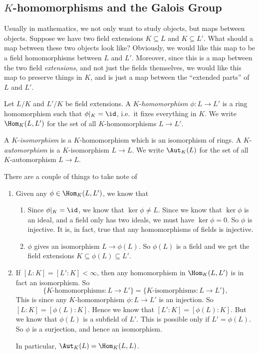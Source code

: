 \documentclass[a4paper]{article}
\begin{document}
\subsection{\texorpdfstring{$K$}{K}-homomorphisms and the Galois Group}
Usually in mathematics, we not only want to study objects, but maps between objects. Suppose we have two field extensions $K \subseteq L$ and $K \subseteq L'$. What should a map between these two objects look like? Obviously, we would like this map to be a field homomorphisms between $L$ and $L'$. Moreover, since this is a map between the two field \emph{extensions}, and not just the fields themselves, we would like this map to preserve things in $K$, and is just a map between the ``extended parts'' of $L$ and $L'$.

\begin{defi}[$K$-homomorphism]
  Let $L/K$ and $L'/K$ be field extensions. A $K$-\emph{homomorphism} $\phi: L \to L'$ is a ring homomorphism such that $\phi|_K = \id$, i.e.\ it fixes everything in $K$. We write $\Hom_K(L, L')$ for the set of all $K$-homomorphisms $L\to L'$.

  A $K$-\emph{isomorphism} is a $K$-homomorphism which is an isomorphism of rings. A $K$-\emph{automorphism} is a $K$-isomorphism $L\to L$. We write $\Aut_K(L)$ for the set of all $K$-automorphism $L\to L$.
\end{defi}
There are a couple of things to take note of
\begin{enumerate}
  \item Given any $\phi \in \Hom_K(L, L')$, we know that
    \begin{enumerate}
      \item Since $\phi|_K = \id$, we know that $\ker \phi \not= L$. Since we know that $\ker \phi$ is an ideal, and a field only has two ideals, we must have $\ker \phi = 0$. So $\phi$ is injective. It is, in fact, true that any homomorphisms of fields is injective.
      \item $\phi$ gives an isomorphism $L \to \phi(L)$. So $\phi(L)$ is a field and we get the field extensions $K\subseteq \phi(L) \subseteq L'$.
    \end{enumerate}
  \item If $[L:K] = [L':K] < \infty$, then any homomorphism in $\Hom_K(L, L')$ is in fact an isomorphism. So
    \[
      \{K\text{-homomorphisms}: L \to L'\} = \{K\text{-isomorphisms}: L\to L'\},
    \]
    This is since any $K$-homomorphism $\phi: L\to L'$ is an injection. So $[L:K] = [\phi(L):K]$. Hence we know that $[L':K] = [\phi(L):K]$. But we know that $\phi(L)$ is a subfield of $L'$. This is possible only if $L' = \phi(L)$. So $\phi$ is a surjection, and hence an isomorphism.

    In particular, $\Aut_K(L) = \Hom_K(L, L)$.
\end{enumerate}
\end{document}
